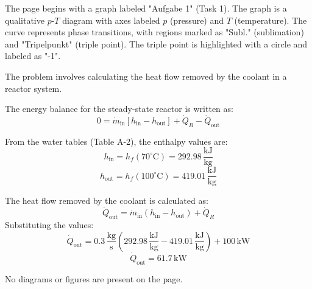The page begins with a graph labeled "Aufgabe 1" (Task 1). The graph is a qualitative \( p \)-\( T \) diagram with axes labeled \( p \) (pressure) and \( T \) (temperature). The curve represents phase transitions, with regions marked as "Subl." (sublimation) and "Tripelpunkt" (triple point). The triple point is highlighted with a circle and labeled as "-1".

The problem involves calculating the heat flow removed by the coolant in a reactor system.  

The energy balance for the steady-state reactor is written as:  
\[
0 = \dot{m}_{\text{in}} \left[ h_{\text{in}} - h_{\text{out}} \right] + \dot{Q}_R - \dot{Q}_{\text{out}}
\]  

From the water tables (Table A-2), the enthalpy values are:  
\[
h_{\text{in}} = h_f(70^\circ\text{C}) = 292.98 \, \frac{\text{kJ}}{\text{kg}}
\]  
\[
h_{\text{out}} = h_f(100^\circ\text{C}) = 419.01 \, \frac{\text{kJ}}{\text{kg}}
\]  

The heat flow removed by the coolant is calculated as:  
\[
\dot{Q}_{\text{out}} = \dot{m}_{\text{in}} \left( h_{\text{in}} - h_{\text{out}} \right) + \dot{Q}_R
\]  
Substituting the values:  
\[
\dot{Q}_{\text{out}} = 0.3 \, \frac{\text{kg}}{\text{s}} \left( 292.98 \, \frac{\text{kJ}}{\text{kg}} - 419.01 \, \frac{\text{kJ}}{\text{kg}} \right) + 100 \, \text{kW}
\]  
\[
\dot{Q}_{\text{out}} = 61.7 \, \text{kW}
\]  

No diagrams or figures are present on the page.